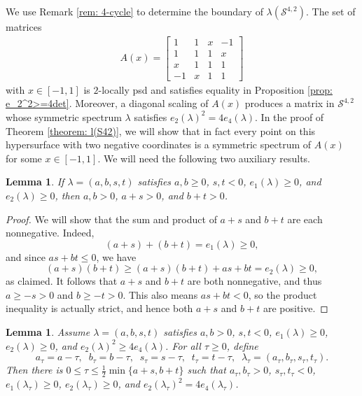 \documentclass[reqno,hidelinks,11pt]{amsart}
\numberwithin{equation}{section}
\newtheorem{lemma}[theorem]{Lemma}
\def\S{\mathcal{S}}
\begin{document}
We use Remark \ref{rem: 4-cycle} to determine the boundary of $\lambda(\mathcal{S}^{4,2})$. The set of matrices
\begin{align}\label{eq: A(x)}
A(x)=\begin{bmatrix}
    1 & 1 & x & -1\\
    1 & 1 & 1 & x\\
    x & 1 & 1 & 1\\
    -1 & x & 1 & 1
    \end{bmatrix}
\end{align}
with $x\in[-1,1]$ is $2$-locally psd and satisfies equality in Proposition \ref{prop: e_2^2>=4det}. Moreover, a diagonal scaling of $A(x)$ produces a matrix in $\S^{4, 2}$ whose symmetric spectrum $\lambda$ satisfies $e_2(\lambda)^2 = 4e_4(\lambda)$. In the proof of Theorem \ref{theorem: l(S42)}, we will show that in fact every point on this hypersurface with two negative coordinates is a symmetric spectrum of $A(x)$ for some $x\in[-1,1]$. We will need the following two auxiliary results.

\begin{lemma}\label{lemma:positive dominates negative}
If $\lambda = (a, b, s, t)$ satisfies $a, b \geq 0$, $s, t < 0$, $e_1(\lambda) \geq 0$, and $e_2(\lambda) \geq 0$, then $a, b > 0$, $a + s > 0$, and $b + t > 0$.
\end{lemma}

\begin{proof}
    We will show that the sum and product of $a + s$ and $b + t$ are each nonnegative. Indeed,
    \[
    (a + s) + (b + t) = e_1(\lambda)\geq 0,
    \]
    and since $as + bt \leq 0$, we have
    \[
    (a + s)(b + t) \geq (a + s)(b + t) + as + bt = e_2(\lambda) \geq 0,
    \]
    as claimed. It follows that $a + s$ and $b + t$ are both nonnegative, and thus $a \geq -s > 0$ and $b \geq -t > 0$. This also means $as + bt < 0$, so the product inequality is actually strict, and hence both $a + s$ and $b + t$ are positive.
\end{proof}

\begin{lemma}\label{lemma: e2-e4 boundary}
    Assume $\lambda = (a, b, s, t)$ satisfies $a, b > 0$, $s, t < 0$, $e_1(\lambda) \geq 0$, $e_2(\lambda) \geq 0$, and $e_2(\lambda)^2 \geq 4e_4(\lambda)$. For all $\tau \geq 0$, define
    \[
    a_\tau = a - \tau, \; \; b_\tau = b - \tau, \; \; s_\tau = s - \tau, \; \; t_\tau = t - \tau, \; \; \lambda_\tau = (a_\tau, b_\tau, s_\tau, t_\tau).
    \]
    Then there is $0 \leq \tau \leq \frac12\min\{a + s, b + t\}$ such that $a_\tau, b_\tau > 0$, $s_\tau, t_\tau < 0$, $e_1(\lambda_\tau) \geq 0$, $e_2(\lambda_\tau) \geq 0$, and $e_2(\lambda_\tau)^2 = 4e_4(\lambda_\tau)$.
\end{lemma}
\end{document}
